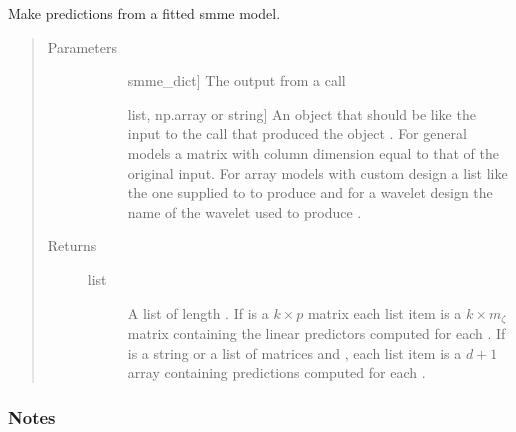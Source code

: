 \documentclass[letterpaper,10pt,english]{sphinxmanual}
\begin{document}
\begin{fulllineitems}
\label{\detokenize{pysmme:pysmme.tools.predict}}
\sphinxAtStartPar
Make predictions from a fitted smme model.
\begin{quote}\begin{description}
\item[{Parameters}] \leavevmode\begin{description}
\item[{}] \leavevmode{[}smme\_dict{]}
\sphinxAtStartPar
The output from a  call

\item[{}] \leavevmode{[}list, np.array or string{]}
\sphinxAtStartPar
An object that should be like the input to the  call that 
produced the object . For general  models a matrix
with column dimension equal to that of  the original input. 
For array models with custom design a list like the one supplied to  to produce 
and for a wavelet design the name of the wavelet used to produce .

\end{description}

\item[{Returns}] \leavevmode\begin{description}
\item[{list}] \leavevmode
\sphinxAtStartPar
A list of length . If  is a \(k \times p\) matrix 
each list item is a \(k \times m_\zeta\) matrix containing the linear
predictors computed for each . If  is a string or  a
list of matrices and ,  each list item is a \(d + 1\) array 
containing predictions computed for each .

\end{description}

\end{description}\end{quote}
\subsubsection*{Notes}


\end{fulllineitems}
\end{document}
